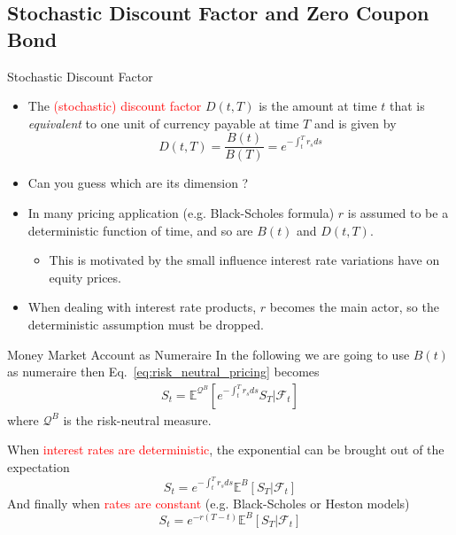\documentclass{beamer}
\begin{document}
\subsection{Stochastic Discount Factor and Zero Coupon Bond}
\begin{frame}{Stochastic Discount Factor}
	\begin{itemize}
		\item The \textcolor{red}{(stochastic) discount factor} $D(t, T)$ is the amount at time $t$ that is \emph{equivalent} to one unit of currency payable at time $T$ and is given by
		\begin{equation}
			D(t, T) = \frac{B(t)}{B(T)} = e^{-\int_t^T r_s ds}
		\end{equation}
		\item Can you guess which are its dimension ?	
		\item In many pricing application (e.g. Black-Scholes formula) $r$ is assumed to be a deterministic function of time, and so are $B(t)$ and $D(t,T)$.
		\begin{itemize}
			\item This is motivated by the small influence interest rate variations have on equity prices.
		\end{itemize}
		\item When dealing with interest rate products, $r$ becomes the main actor, so the deterministic assumption must be dropped.
	\end{itemize}	
\end{frame}

\begin{frame}{Money Market Account as Numeraire}
	In the following we are going to use $B(t)$ as numeraire then  Eq.~\ref{eq:risk_neutral_pricing} becomes
	\begin{equation*}
		\begin{aligned}
			S_t = \mathbb{E}^{\mathcal{Q}^B}\left[e^{-\int_t^T r_s ds}S_T|\mathcal{F}_t\right]
		\end{aligned}
	\end{equation*}
	where $\mathcal{Q}^B$ is the risk-neutral measure.%
	
	When \textcolor{red}{interest rates are deterministic}, the exponential can be brought out of the expectation
	\begin{equation*}
		S_t = e^{-\int_t^T r_s ds} \mathbb{E}^B\left[S_T|\mathcal{F}_t\right]
	\end{equation*}
	And finally when \textcolor{red}{rates are constant} (e.g. Black-Scholes or Heston models)
	\begin{equation*}
		S_t = e^{-r(T-t)}\mathbb{E}^B\left[S_T|\mathcal{F}_t\right]
	\end{equation*}
\end{frame}
\end{document}
